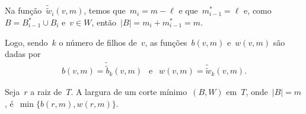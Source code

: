 \begin{itemize}
	Na função~$\tilde{\tilde{w}}_{i}(v,m)$, 
	temos que~${m_i = m-\ell}$ e que~${m_{i-1}^* = \ell}$
	e, como~${B = B_{i-1}^* \cup B_i}$ e~${v\in W}$, 
	então~${|B| = m_i + m_{i-1}^*= m}$.

	\bigskip

	Logo, sendo~$k$ o número de filhos de~$v$,
	as funções~$b(v,m)$ e~$w(v,m)$ são dadas por
	\begin{align*}
		b(v,m) = \tilde{\tilde{b}}_k(v,m)\ \ \text{ e }\ \
		w(v,m) = \tilde{\tilde{w}}_k(v,m). \nonumber
	\end{align*}

	Seja~$r$ a raiz de~$T$. 
	A largura de um corte mínimo~$(B,W)$ em~$T$, onde~${|B|=m}$, 
	é~$\min\{b(r,m), w(r,m)\}$.
\end{itemize}